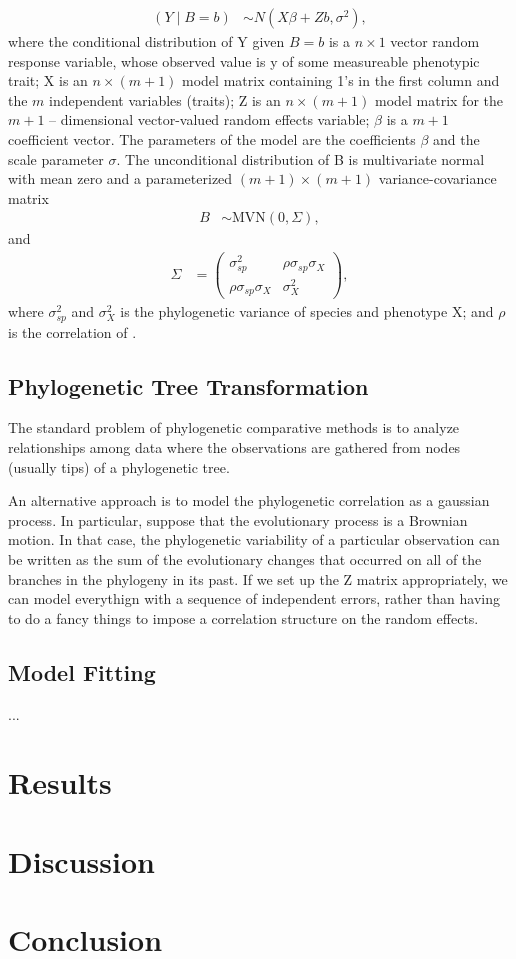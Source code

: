 \documentclass[12pt]{article}
\begin{document}
\begin{align}
(Y \mid B=b) & \sim N(X\beta + Zb, \sigma^{2}),
\end{align}
where the conditional distribution of Y given $ B = b$ is a $n \times 1$ vector random response variable, whose observed value is y of some measureable phenotypic trait; 
X is an $n \times (m + 1)$ model matrix containing 1's in the first column and the $m$ independent variables (traits);
Z is an $n \times (m + 1)$ model matrix for the $m + 1$ -- dimensional vector-valued random effects variable; 
$\beta$ is a $ m + 1 $ coefficient vector.
The parameters of the model are the coefficients $\beta$ and the scale parameter $\sigma$.
The unconditional distribution of B is multivariate normal with mean zero and a parameterized $(m + 1) \times (m + 1)$ variance-covariance matrix
\begin{align}
B & \sim \mathrm{MVN}(0,\Sigma),
\end{align}
and
\begin{align}
\Sigma & = \begin{pmatrix} \sigma^2_{sp} & \rho \sigma_{sp} \sigma_{X} \\ \rho \sigma_{sp} \sigma_{X} & \sigma^2_{X} \end{pmatrix},
\end{align}
where $\sigma^{2}_{sp}$ and $\sigma^{2}_{X}$ is the phylogenetic variance of species and phenotype X; 
and $\rho$ is the correlation of .


\subsection{Phylogenetic Tree Transformation}
The standard problem of phylogenetic comparative methods is to analyze relationships among data where the observations are gathered from nodes (usually tips) of a phylogenetic tree. 

An alternative approach is to model the phylogenetic correlation as a gaussian process. 
In particular, suppose that the evolutionary process is a Brownian motion. 
In that case, the phylogenetic variability of a particular observation can be written as the sum of the evolutionary changes that occurred on all of the branches in the phylogeny in its past. 
If we set up the Z matrix appropriately, we can model everythign with a sequence of independent errors, rather than having to do a fancy things to impose a correlation structure on the random effects. 

\subsection{Model Fitting}

...


\section{Results}

\section{Discussion}

\section{Conclusion}
\end{document}
